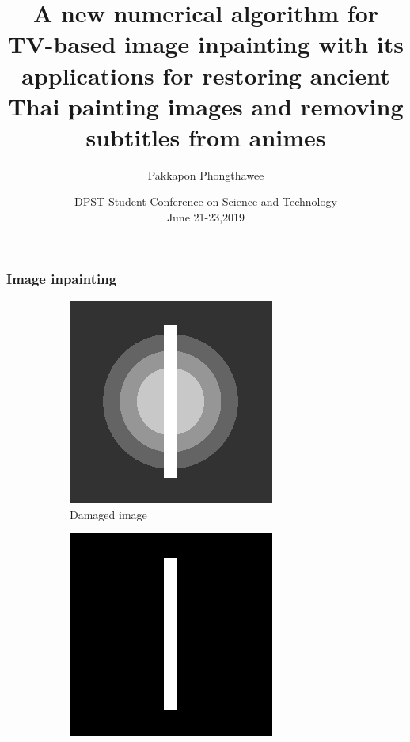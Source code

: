 \documentclass[xcolor=dvipsnames, xetex,serif]{beamer}
\title[วิธีเชิงตัวเลขสำหรับต่อเติมภาพ]{A new numerical algorithm for TV-based image inpainting with its applications for restoring ancient Thai painting images and removing subtitles from animes}
\author[Pakkapon]{Pakkapon Phongthawee}
\institute[Silpakorn]{
 	Department of Mathematics\\
 	Silpakorn University \\}
\date[UAMC 2019]{DPST Student Conference on Science and Technology\\June 21-23,2019}
\begin{document}
    \begin{frame}
        \titlepage 
    \end{frame}
    \begin{frame}
        \frametitle{Image inpainting} 
        \begin{figure}[H]
            \centering
            \begin{subfigure}{0.3\linewidth}
                \centering
                \includegraphics[width=0.8\linewidth]{images/grayscale_inpaint/toinpaint.png}
                \caption{Damaged image}
            \end{subfigure}
            \begin{subfigure}{0.3\linewidth}
                \centering
                \includegraphics[width=0.8\linewidth]{images/grayscale_inpaint/inpaintdomain.png}

\end{subfigure}
\end{figure}
\end{frame}
\end{document}
